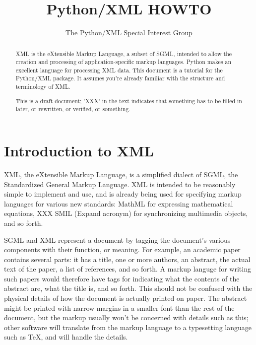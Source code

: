 \documentclass{howto}
\title{Python/XML HOWTO}
\author{The Python/XML Special Interest Group}
\begin{document}
\maketitle

\begin{abstract}
\noindent
XML is the eXtensible Markup Language, a subset of SGML, intended to
allow the creation and processing of application-specific markup
languages.  Python makes an excellent language for processing XML
data.  This document is a tutorial for the Python/XML package.  It
assumes you're already familiar with the structure and terminology of
XML.

This is a draft document; 'XXX' in the text indicates that something
has to be filled in later, or rewritten, or verified, or something.  
\end{abstract}

\tableofcontents

\section{Introduction to XML}

XML, the eXtensible Markup Language, is a simplified dialect of SGML,
the Standardized General Markup Language.  XML is intended to be
reasonably simple to implement and use, and is already being used for
specifying markup languages for various new standards: MathML for
expressing mathematical equations, XXX SMIL (Expand acronym) for
synchronizing multimedia objects, and so forth.

SGML and XML represent a document by tagging the document's various
components with their function, or meaning.  For example, an academic
paper contains several parts: it has a title, one or more authors, an
abstract, the actual text of the paper, a list of references, and so
forth.  A markup languge for writing such papers would therefore have
tags for indicating what the contents of the abstract are, what the
title is, and so forth.  This should not be confused with the physical
details of how the document is actually printed on paper.  The
abstract might be printed with narrow margins in a smaller font than
the rest of the document, but the markup usually won't be concerned
with details such as this; other software will translate from the
markup language to a typesetting language such as \TeX, and will
handle the details.
\end{document}
